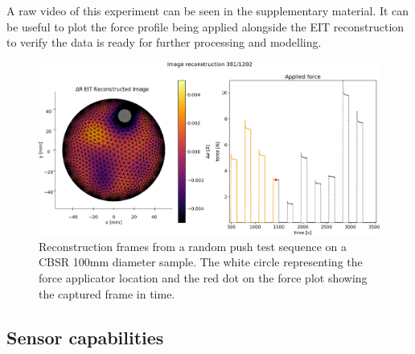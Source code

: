 A raw video of this experiment can be seen in the supplementary material. It can be useful to plot the force profile being applied alongside the EIT reconstruction to verify the data is ready for further processing and modelling. 
\begin{figure}[H]
\centering
\includegraphics[width=0.9\linewidth]{Figures/CBSR_8p_OG_10push_RAND1_strain_120s_1mA_2_frame381.png}
\caption{Reconstruction frames from a random push test sequence on a CBSR 100mm diameter sample. The white circle representing the force applicator location and the red dot on the force plot showing the captured frame in time.}
\label{fig:rand_recon_and force_result}
\end{figure}


\subsection{Sensor capabilities}

